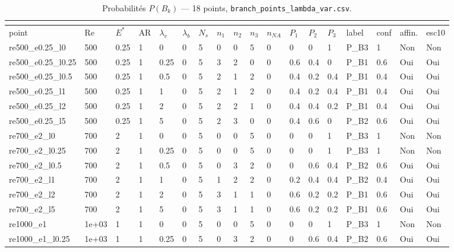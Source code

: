 \documentclass[11pt,a4paper]{article}
\begin{document}
\begin{landscape}
\begingroup\tiny
    \setlength{\tabcolsep}{1.2pt}
    \begin{longtable}{*{18}{l}}
    \caption{Probabilités $P(B_k)$ --- 18 points, \texttt{branch\_points\_lambda\_var.csv}.}\\
    \label{tab:lv_points}\\
    \toprule
    point & Re & $E^*$ & AR & $\lambda_v$ & $\lambda_b$ & $N_s$ & $n_1$ & $n_2$ & $n_3$ & $n_{NA}$ & $P_1$ & $P_2$ & $P_3$ & label & conf & affin. & esc10 \\
    \midrule
    \endhead
    \bottomrule
    \endlastfoot
    re500\_e0.25\_l0 & 500 & 0.25 & 1 & 0 & 0 & 5 & 0 & 0 & 5 & 0 & 0 & 0 & 1 & P\_B3 & 1 & Non & Non \\
    re500\_e0.25\_l0.25 & 500 & 0.25 & 1 & 0.25 & 0 & 5 & 3 & 2 & 0 & 0 & 0.6 & 0.4 & 0 & P\_B1 & 0.6 & Oui & Oui \\
    re500\_e0.25\_l0.5 & 500 & 0.25 & 1 & 0.5 & 0 & 5 & 2 & 1 & 2 & 0 & 0.4 & 0.2 & 0.4 & P\_B1 & 0.4 & Oui & Oui \\
    re500\_e0.25\_l1 & 500 & 0.25 & 1 & 1 & 0 & 5 & 2 & 1 & 2 & 0 & 0.4 & 0.2 & 0.4 & P\_B1 & 0.4 & Oui & Oui \\
    re500\_e0.25\_l2 & 500 & 0.25 & 1 & 2 & 0 & 5 & 2 & 2 & 1 & 0 & 0.4 & 0.4 & 0.2 & P\_B1 & 0.4 & Oui & Oui \\
    re500\_e0.25\_l5 & 500 & 0.25 & 1 & 5 & 0 & 5 & 2 & 3 & 0 & 0 & 0.4 & 0.6 & 0 & P\_B2 & 0.6 & Oui & Oui \\
    re700\_e2\_l0 & 700 & 2 & 1 & 0 & 0 & 5 & 0 & 0 & 5 & 0 & 0 & 0 & 1 & P\_B3 & 1 & Non & Non \\
    re700\_e2\_l0.25 & 700 & 2 & 1 & 0.25 & 0 & 5 & 0 & 0 & 5 & 0 & 0 & 0 & 1 & P\_B3 & 1 & Non & Non \\
    re700\_e2\_l0.5 & 700 & 2 & 1 & 0.5 & 0 & 5 & 0 & 3 & 2 & 0 & 0 & 0.6 & 0.4 & P\_B2 & 0.6 & Oui & Oui \\
    re700\_e2\_l1 & 700 & 2 & 1 & 1 & 0 & 5 & 1 & 2 & 2 & 0 & 0.2 & 0.4 & 0.4 & P\_B2 & 0.4 & Oui & Oui \\
    re700\_e2\_l2 & 700 & 2 & 1 & 2 & 0 & 5 & 3 & 1 & 1 & 0 & 0.6 & 0.2 & 0.2 & P\_B1 & 0.6 & Oui & Oui \\
    re700\_e2\_l5 & 700 & 2 & 1 & 5 & 0 & 5 & 3 & 1 & 1 & 0 & 0.6 & 0.2 & 0.2 & P\_B1 & 0.6 & Oui & Oui \\
    re1000\_e1 & 1e+03 & 1 & 1 & 0 & 0 & 5 & 0 & 0 & 5 & 0 & 0 & 0 & 1 & P\_B3 & 1 & Non & Non \\
    re1000\_e1\_l0.25 & 1e+03 & 1 & 1 & 0.25 & 0 & 5 & 0 & 3 & 2 & 0 & 0 & 0.6 & 0.4 & P\_B2 & 0.6 & Oui & Oui \\

\end{longtable}
\end{landscape}
\end{document}
